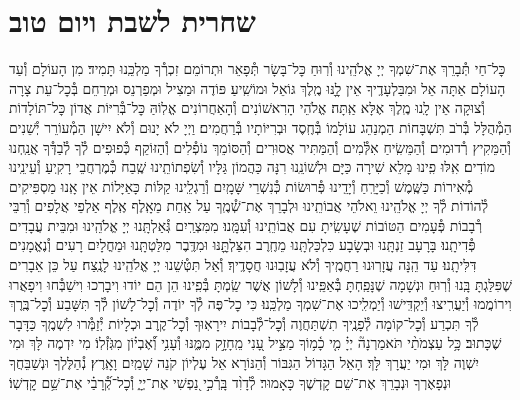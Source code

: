 \documentclass[twoside, openany, parskip=half, 11pt]{book}
\begin{document}
\chapter[שחרית לשבת ויו״ט]{ שחרית לשבת ויום טוב }




\label{nishmas}
כׇּל־חַי תְּ֯בָרֵךְ אֶת־שִׁמְךָ יְיָ אֱלֹהֵֽינוּ וְ֯רֽוּחַ כׇּל־בָּשָׂר תְּ֯פָאֵר וּתְרוֹמֵם זִכְרְ֯ךָ מַלְכֵּֽנוּ תָּמִיד׃ מִן הָעוֹלָם וְ֯עַד הָעוֹלָם אַתָּה אֵל וּמִבַּלְעָדֶֽיךָ אֵין לׇׇֽנּוּ מֶֽלֶךְ גּוֹאֵל וּמוֹשִֽׁיעַ׃
פּוֹדֶה וּמַצִיל וּמְפַרְנֵס וּמְרַחֵם בְּ֯כׇל־עֵת צָרָה וְ֯צוּקָה אֵין לָֽנוּ מֶֽלֶךְ אֶלָּא אַֽתָּה׃ אֱלֹהֵי הָרִאשׁוֹנִים וְ֯הָאַחֲרוֹנִים אֱלֽוֹהַּ כׇּל־בְּ֯רִיּוֹת אֲדוֹן כׇּל־תּוֹלָדוֹת הַמְ֯הֻלָּל בְּ֯רֹב תִּשְׁבָּחוֹת הַמְנַהֵג עוֹלָמוֹ בְּ֯חֶֽסֶד וּבְרִיּוֹתָיו בְּ֯רַחֲמִים׃ וַיְיָ לֹא יָנוּם וְ֯לֹא יִישָׁן הַמְ֯עוֹרֵר יְ֯שֵׁנִים וְ֯הַמֵּקִיץ רְ֯דוּמִים וְ֯הַמֵּשִֽׂיחַ אִלְּ֯מִים וְ֯הַמַּתִּיר אֲסוּרִים וְ֯הַסּוֹמֵךְ נוֹפְ֯לִים וְ֯הַזּוֹקֵף כְּ֯פוּפִים לְ֯ךָ לְ֯בַדְּ֯ךָ אֲנַֽחְנוּ מוֹדִים׃ אִֽלּוּ פִֽינוּ מָלֵא שִׁירָה כַּיָּם וּלְשׁוֹנֵֽנוּ רִנָּה כַּהֲמוֹן גַּלָּיו וְ֯שִׂפְתוֹתֵֽינוּ שֶֽׁבַח כְּ֯מֶרְחֲבֵי רָקִֽיעַ וְ֯עֵינֵֽינוּ מְ֯אִירוֹת כַּשֶּֽׁמֶשׁ וְ֯כַיָּרֵֽחַ וְ֯יָדֵֽינוּ פְּ֯רוּשׂוֹת כְּ֯נִשְׁרֵי שָּׁמָֽיִם וְ֯רַגְלֵֽינוּ קַלּוֹת כָּאַיָּלוֹת אֵין אָֽנוּ מַסְפִּיקִים לְ֯הוֹדוֹת לְ֯ךָ יְיָ אֱלֹהֵֽינוּ וֵאלֹהֵי אֲבוֹתֵֽינוּ וּלְבָרֵךְ אֶת־שְׁ֯מֶֽךָ עַל אַֽחַת מֵאָֽלֶף אֶֽלֶף אַלְפֵי אֲלָפִים וְ֯רִבֵּי רְ֯בָבוֹת פְּ֯עָמִים הַטּוֹבוֹת שֶׁעָשִֽׂיתָ עִם אֲבוֹתֵֽינוּ וְ֯עִמָּֽנוּ׃ מִמִּצְרַֽיִם גְּ֯אַלְתָּֽנוּ יְיָ אֱלֹהֵֽינוּ וּמִבֵּית עֲבָדִים פְּ֯דִיתָֽנוּ׃ בָּרָעָב זַנְתָּֽנוּ וּבְשָׂבָע כִּלְכַּלְתָּֽנוּ מֵחֶֽרֶב הִצַּלְתׇׇּֽנּוּ וּמִדֶּֽבֶר מִלַּטְתָּֽנוּ וּמֵחֳלָיִם רָעִים וְ֯נֶאֱמָנִים דִּלִּיתָֽנוּ׃ עַד הֵֽנָּה עֲזָרֽוּנוּ רַחֲמֶֽיךָ וְ֯לֹא עֲזָבֽוּנוּ חֲסָדֶֽיךָ׃ וְ֯אַל תִּטְּ֯שֵׁנוּ יְיָ אֱלֹהֵֽינוּ לָנֶֽצַח׃ עַל כֵּן אֵבָרִים שֶׁפִּלַּגְתָּ בָּֽנוּ וְ֯רֽוּחַ וּנְשָׁמָה שֶׁנָּפַֽחְתָּ בְּ֯אַפֵּֽינוּ וְ֯לָשׁוֹן אֲשֶׁר שַֽׂמְתָּ בְּ֯פִֽינוּ הֵן הֵם יוֹדוּ וִיבָרְכוּ וִישַׁבְּ֯חוּ וִיפָאֲרוּ וִירוֹמֲמוּ וְ֯יַעֲרִֽיצוּ וְ֯יַקְדִּֽישׁוּ וְ֯יַמְלִֽיכוּ אֶת־שִׁמְךָ מַלְכֵּֽנוּ׃ כִּי כׇל־פֶּה לְ֯ךָ יוֹדֶה וְ֯כׇל־לָשׁוֹן לְ֯ךָ תִּשָּׁבַע וְ֯כׇל־בֶּֽרֶךְ לְ֯ךָ תִּכְרַע וְ֯כׇל־קוֹמָה לְ֯פָנֶֽיךָ תִשְׁתַּחֲוֶה וְ֯כׇל־לְ֯בָבוֹת יִירָאֽוּךָ וְ֯כׇל־קֶֽרֶב וּכְלָיוֹת יְ֯זַמְּ֯רוּ לִשְׁמֶֽךָ כַּדָּבָר שֶׁכָּתוּב׃
כָּ֥ל עַצְמֹתַ֨י תֹּאמַרְנָה֘ יְיָ֗ מִ֤י כָ֫מ֥וֹךָ מַצִּ֣יל עָ֭נִי מֵֽחָזָ֣ק מִמֶּ֑נּוּ וְ֯עָנִ֥י וְ֝֯אֶבְי֗וֹן מִגֹּֽזְ֯לֽוֹ׃ מִי יִדְמֶה לָּךְ וּמִי יִשְׁוֶה לָּךְ וּמִי יַעֲרָךְ לָּךְ׃ הָאֵל הַגָּדוֹל הַגִּבּוֹר וְ֯הַנּוֹרָא אֵל עֶלְיוֹן קֹנֵה שָׁמַֽיִם וָאָֽרֶץ׃
נְ֯הַלֶּלְךָ וּנְשַׁבֵּחֲךָ וּנְפָאֶרְךָ וּנְבָרֵךְ אֶת־שֵׁם קׇדְשֶׁךָ כָּאָמוּר׃
לְ֯דָוִ֨ד בָּֽרְ֯כִ֣י נַ֭פְשִׁי אֶת־יְיָ֑ וְ֯כׇל־קְ֝֯רָבַ֗י אֶת־שֵׁ֥ם קׇדְשֽׁוֹ׃
\end{document}
